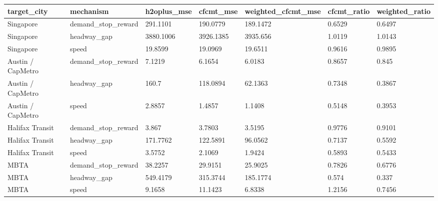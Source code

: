 \begin{tabular}{lllllll}
\toprule
target\_city & mechanism & h2oplus\_mse & cfcmt\_mse & weighted\_cfcmt\_mse & cfcmt\_ratio & weighted\_ratio \\
\midrule
Singapore & demand\_stop\_reward & 291.1101 & 190.0779 & 189.1472 & 0.6529 & 0.6497 \\
Singapore & headway\_gap & 3880.1006 & 3926.1385 & 3935.656 & 1.0119 & 1.0143 \\
Singapore & speed & 19.8599 & 19.0969 & 19.6511 & 0.9616 & 0.9895 \\
Austin / CapMetro & demand\_stop\_reward & 7.1219 & 6.1654 & 6.0183 & 0.8657 & 0.845 \\
Austin / CapMetro & headway\_gap & 160.7 & 118.0894 & 62.1363 & 0.7348 & 0.3867 \\
Austin / CapMetro & speed & 2.8857 & 1.4857 & 1.1408 & 0.5148 & 0.3953 \\
Halifax Transit & demand\_stop\_reward & 3.867 & 3.7803 & 3.5195 & 0.9776 & 0.9101 \\
Halifax Transit & headway\_gap & 171.7762 & 122.5891 & 96.0562 & 0.7137 & 0.5592 \\
Halifax Transit & speed & 3.5752 & 2.1069 & 1.9424 & 0.5893 & 0.5433 \\
MBTA & demand\_stop\_reward & 38.2257 & 29.9151 & 25.9025 & 0.7826 & 0.6776 \\
MBTA & headway\_gap & 549.4179 & 315.3744 & 185.1774 & 0.574 & 0.337 \\
MBTA & speed & 9.1658 & 11.1423 & 6.8338 & 1.2156 & 0.7456 \\
\bottomrule
\end{tabular}

